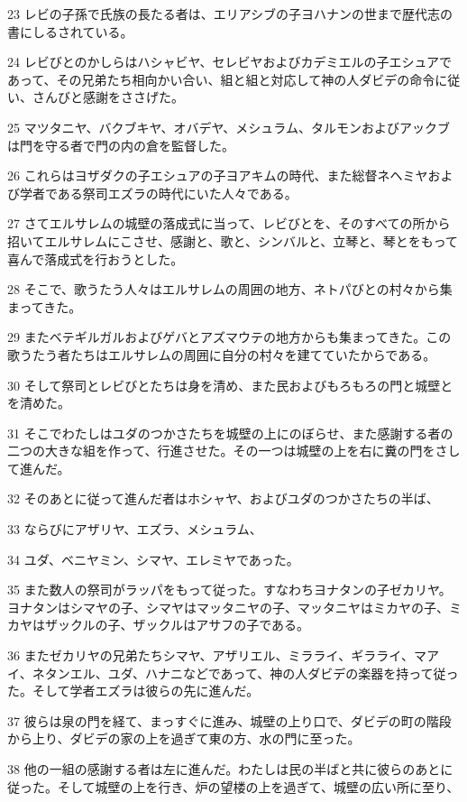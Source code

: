 \par 23 レビの子孫で氏族の長たる者は、エリアシブの子ヨハナンの世まで歴代志の書にしるされている。
\par 24 レビびとのかしらはハシャビヤ、セレビヤおよびカデミエルの子エシュアであって、その兄弟たち相向かい合い、組と組と対応して神の人ダビデの命令に従い、さんびと感謝をささげた。
\par 25 マツタニヤ、バクブキヤ、オバデヤ、メシュラム、タルモンおよびアックブは門を守る者で門の内の倉を監督した。
\par 26 これらはヨザダクの子エシュアの子ヨアキムの時代、また総督ネヘミヤおよび学者である祭司エズラの時代にいた人々である。
\par 27 さてエルサレムの城壁の落成式に当って、レビびとを、そのすべての所から招いてエルサレムにこさせ、感謝と、歌と、シンバルと、立琴と、琴とをもって喜んで落成式を行おうとした。
\par 28 そこで、歌うたう人々はエルサレムの周囲の地方、ネトパびとの村々から集まってきた。
\par 29 またベテギルガルおよびゲバとアズマウテの地方からも集まってきた。この歌うたう者たちはエルサレムの周囲に自分の村々を建てていたからである。
\par 30 そして祭司とレビびとたちは身を清め、また民およびもろもろの門と城壁とを清めた。
\par 31 そこでわたしはユダのつかさたちを城壁の上にのぼらせ、また感謝する者の二つの大きな組を作って、行進させた。その一つは城壁の上を右に糞の門をさして進んだ。
\par 32 そのあとに従って進んだ者はホシャヤ、およびユダのつかさたちの半ば、
\par 33 ならびにアザリヤ、エズラ、メシュラム、
\par 34 ユダ、ベニヤミン、シマヤ、エレミヤであった。
\par 35 また数人の祭司がラッパをもって従った。すなわちヨナタンの子ゼカリヤ。ヨナタンはシマヤの子、シマヤはマッタニヤの子、マッタニヤはミカヤの子、ミカヤはザックルの子、ザックルはアサフの子である。
\par 36 またゼカリヤの兄弟たちシマヤ、アザリエル、ミラライ、ギラライ、マアイ、ネタンエル、ユダ、ハナニなどであって、神の人ダビデの楽器を持って従った。そして学者エズラは彼らの先に進んだ。
\par 37 彼らは泉の門を経て、まっすぐに進み、城壁の上り口で、ダビデの町の階段から上り、ダビデの家の上を過ぎて東の方、水の門に至った。
\par 38 他の一組の感謝する者は左に進んだ。わたしは民の半ばと共に彼らのあとに従った。そして城壁の上を行き、炉の望楼の上を過ぎて、城壁の広い所に至り、
